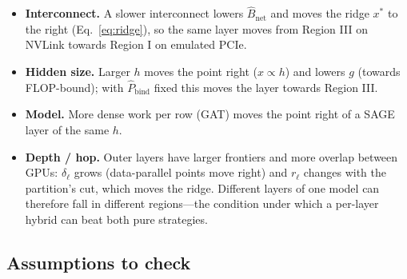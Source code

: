 \begin{itemize}\itemsep1pt
  \item \textbf{Interconnect.} A slower interconnect lowers $\hat{B}_{\mathrm{net}}$ and moves the
        ridge $x^{*}$ to the right (Eq.~\eqref{eq:ridge}), so the same layer moves from Region III
        on NVLink towards Region I on emulated PCIe.
  \item \textbf{Hidden size.} Larger $h$ moves the point right ($x \propto h$) and lowers $g$
        (towards FLOP-bound); with $\hat{P}_{\mathrm{bind}}$ fixed this moves the layer towards
        Region III.
  \item \textbf{Model.} More dense work per row (GAT) moves the point right of a SAGE layer of the
        same $h$.
  \item \textbf{Depth / hop.} Outer layers have larger frontiers and more overlap between GPUs:
        $\delta_\ell$ grows (data-parallel points move right) and $r_\ell$ changes with the
        partition's cut, which moves the ridge. Different layers of one model can therefore fall
        in different regions---the condition under which a per-layer hybrid can beat both pure
        strategies.
\end{itemize}

\subsection{Assumptions to check}
\label{sec:cm-assumptions}

